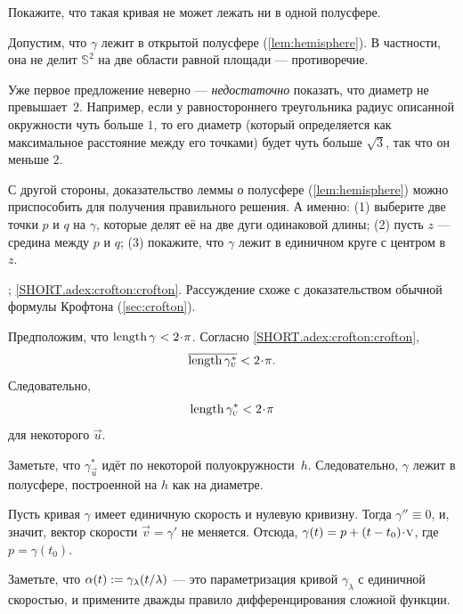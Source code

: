 Покажите, что такая кривая не может лежать ни в одной полусфере.

Допустим, что $\gamma$ лежит в открытой полусфере (\ref{lem:hemisphere}).
В частности, она не делит $\mathbb{S}^2$ на две области равной площади --- противоречие.

Уже первое предложение неверно --- \textit{недостаточно} показать, что диаметр не превышает~$2$.
Например, если у равностороннего треугольника радиус описанной окружности чуть больше $1$,
то его диаметр (который определяется как максимальное расстояние между его точками) будет чуть больше $\sqrt3$, так что он меньше $2$.

С другой стороны, доказательство леммы о полусфере (\ref{lem:hemisphere}) можно приспособить для получения правильного решения.
А именно: (1) выберите две точки $p$ и $q$ на $\gamma$, которые делят её на две дуги одинаковой длины;
(2) пусть $z$ --- средина между $p$ и $q$;
(3) покажите, что $\gamma$ лежит в единичном круге с центром в~$z$.

\parbf{\ref{adex:crofton}}; \ref{SHORT.adex:crofton:crofton}.
Рассуждение схоже с доказательством обычной формулы Крофтона (\ref{sec:crofton}).

Предположим, что $\length \gamma<2\cdot\pi$.
Согласно \ref{SHORT.adex:crofton:crofton},
\[\overline{\length \gamma^*_{\vec u}}<2\cdot\pi.\]
Следовательно, 
\[\length \gamma^*_{\vec u}<2\cdot\pi\]
для некоторого ${\vec u}$. 

Заметьте, что $\gamma^*_{\vec u}$ идёт по некоторой полуокружности~$h$.
Следовательно, $\gamma$ лежит в полусфере, построенной на $h$ как на диаметре.


\setcounter{eqtn}{0}

Пусть кривая $\gamma$ имеет единичную скорость и нулевую кривизну. 
Тогда $\gamma''\equiv 0$, и, значит, вектор скорости $\vec v=\gamma'$ не меняется.
Отсюда, $\gamma(t)\z=p+(t-t_0)\cdot \vec v$, где $p=\gamma(t_0)$.

Заметьте, что $\alpha(t)\mathrel{:=}\gamma_{\lambda}(t/\lambda)$ --- это параметризация кривой $ \gamma_{\lambda}$ с единичной скоростью,
и примените дважды правило дифференцирования сложной функции.

